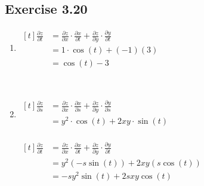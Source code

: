 \documentclass[11pt,fleqn]{book} %
\begin{document}
{~~~}

\subsection*{Exercise 3.20}

\begin{enumerate}
    \item $\begin{aligned}[t]
        \frac{\partial z}{\partial t} & = \frac{\partial z}{\partial x} \cdot \frac{\partial x}{\partial t} + \frac{\partial z}{\partial y} \cdot \frac{\partial y}{\partial t} \\
         & = 1 \cdot \cos(t) + (-1)(3) \\
         & = \cos(t) - 3
    \end{aligned}$

    {~~~}

    \item $\begin{aligned}[t]
        \frac{\partial z}{\partial s} & = \frac{\partial z}{\partial x} \cdot \frac{\partial x}{\partial s} + \frac{\partial z}{\partial y} \cdot \frac{\partial y}{\partial s} \\
         & = y^2 \cdot \cos(t) + 2xy \cdot \sin(t) \\
    \end{aligned}$ 
    \qquad\qquad
    \begin{minipage}[t]{0.45\linewidth}
        $\begin{aligned}[t]
            \frac{\partial z}{\partial t} & = \frac{\partial z}{\partial x} \cdot \frac{\partial x}{\partial t} + \frac{\partial z}{\partial y} \cdot \frac{\partial y}{\partial t} \\
             & = y^2 (-s \sin(t)) + 2xy (s \cos(t)) \\
             & = -sy^2 \sin(t) + 2sxy \cos(t)
        \end{aligned}$
    \end{minipage}

    {~~~}
    

\end{enumerate}
\end{document}
